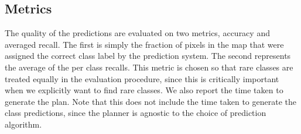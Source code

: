 \subsection{Metrics}
The quality of the predictions are evaluated on two metrics, accuracy and averaged recall. The first is simply the fraction of pixels in the map that were assigned the correct class label by the prediction system. The second represents the average of the per class recalls. This metric is chosen so that rare classes are treated equally in the evaluation procedure, since this is critically important when we explicitly want to find rare classes. We also report the time taken to generate the plan. Note that this does not include the time taken to generate the class predictions, since the planner is agnostic to the choice of prediction algorithm.